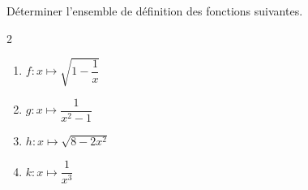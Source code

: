 \begin{exo}{}
	Déterminer l'ensemble de définition des fonctions suivantes.
	\vspace*{-2mm}
	\begin{multicols}{2}
		\begin{enumerate}
			\item $f : x \mapsto \sqrt{1 - \dfrac{1}{x}}$
			\item $g : x \mapsto \dfrac{1}{x^2 - 1}$
			\item $h : x \mapsto \sqrt{8 - 2x^2}$
			\item $k : x \mapsto \dfrac{1}{x^3}$
		\end{enumerate}
	\end{multicols}\vspace*{-2mm}
\end{exo}
